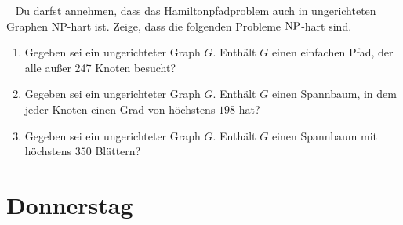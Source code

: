 \documentclass{uebung_cs}
\begin{document}
\begin{exercise}[$\NP$-Härte]\
	Du darfst annehmen, dass das Hamiltonpfadproblem auch in ungerichteten Graphen NP-hart ist.
	Zeige, dass die folgenden Probleme $\NP$-hart sind.
	\begin{enumerate}
		\item Gegeben sei ein ungerichteter Graph $G$. Enthält $G$ einen einfachen Pfad, der alle außer 247 Knoten besucht?
		\item Gegeben sei ein ungerichteter Graph $G$. Enthält $G$ einen Spannbaum, in dem jeder Knoten einen Grad von höchstens $198$ hat?
		\item Gegeben sei ein ungerichteter Graph $G$. Enthält $G$ einen Spannbaum mit höchstens $350$ Blättern?
	\end{enumerate}
\end{exercise}

\section*{Donnerstag}
\end{document}
